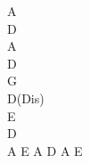 \begin{chordw}
    \begin{footTwelve}
    A\\
    D\\
    A\\
    D\\
    G\\
    D(Dis)\\
    E\\
    D\\
    A E A D A E
\end{footTwelve}
\end{chordw}